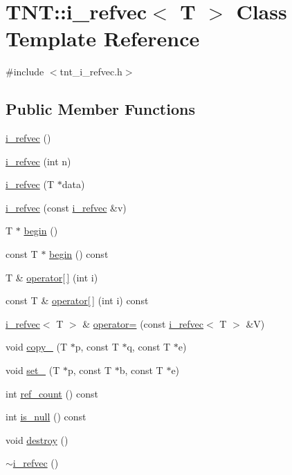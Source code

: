 \hypertarget{classTNT_1_1i__refvec}{\section{T\-N\-T\-:\-:i\-\_\-refvec$<$ T $>$ Class Template Reference}
\label{classTNT_1_1i__refvec}
}


{\ttfamily \#include $<$tnt\-\_\-i\-\_\-refvec.\-h$>$}

\subsection*{Public Member Functions}
\begin{DoxyCompactItemize}
\item 
\hyperlink{classTNT_1_1i__refvec_a83b19a5a8ae088c4996579f1f5e03578}{i\-\_\-refvec} ()
\item 
\hyperlink{classTNT_1_1i__refvec_af331cca09a3d6ec6ba51cff9fd4a3c1f}{i\-\_\-refvec} (int n)
\item 
\hyperlink{classTNT_1_1i__refvec_a53d5023955c537c1c2e112506c89714f}{i\-\_\-refvec} (T $\ast$data)
\item 
\hyperlink{classTNT_1_1i__refvec_af9b07aed8d397737c5bceada825b8ada}{i\-\_\-refvec} (const \hyperlink{classTNT_1_1i__refvec}{i\-\_\-refvec} \&v)
\item 
T $\ast$ \hyperlink{classTNT_1_1i__refvec_a254ea4b6909abc147991b0f3d58d77a7}{begin} ()
\item 
const T $\ast$ \hyperlink{classTNT_1_1i__refvec_a68af5733b8bdbb7aab525c34a0c22467}{begin} () const 
\item 
T \& \hyperlink{classTNT_1_1i__refvec_ae72a1576302f9bbecd64cfc273c885c2}{operator\mbox{[}$\,$\mbox{]}} (int i)
\item 
const T \& \hyperlink{classTNT_1_1i__refvec_a7c3a2ad277753f218f9638c21ac2fc61}{operator\mbox{[}$\,$\mbox{]}} (int i) const 
\item 
\hyperlink{classTNT_1_1i__refvec}{i\-\_\-refvec}$<$ T $>$ \& \hyperlink{classTNT_1_1i__refvec_a9957dd1544849ec1241fb9b7356daff0}{operator=} (const \hyperlink{classTNT_1_1i__refvec}{i\-\_\-refvec}$<$ T $>$ \&V)
\item 
void \hyperlink{classTNT_1_1i__refvec_ad8f94f1699e8f34dcfd7579be9121022}{copy\-\_\-} (T $\ast$p, const T $\ast$q, const T $\ast$e)
\item 
void \hyperlink{classTNT_1_1i__refvec_ae24b3e948c0f8052ac64cf70fe7805ad}{set\-\_\-} (T $\ast$p, const T $\ast$b, const T $\ast$e)
\item 
int \hyperlink{classTNT_1_1i__refvec_a501e215b0c97e794b5e2c668b2660498}{ref\-\_\-count} () const 
\item 
int \hyperlink{classTNT_1_1i__refvec_a117bf8103edf5513cea1b524a9573a1a}{is\-\_\-null} () const 
\item 
void \hyperlink{classTNT_1_1i__refvec_ae92db69e3b80c46a51a14d8403df4c15}{destroy} ()
\item 
\hyperlink{classTNT_1_1i__refvec_a4d43f30694d7ab2ce1a62331cff62279}{$\sim$i\-\_\-refvec} ()
\end{DoxyCompactItemize}


